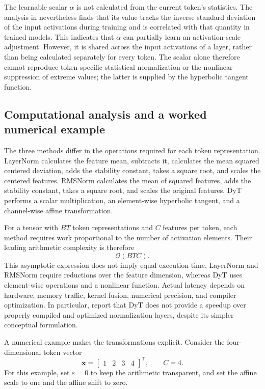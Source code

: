 The learnable scalar \(\alpha\) is not calculated from the current token's
statistics. The analysis in \textcite{zhu2025dyt} nevertheless finds that
its value tracks the inverse standard deviation of the input activations
during training and is correlated with that quantity in trained models.
This indicates that \(\alpha\) can partially learn an activation-scale
adjustment. However, it is shared across the input activations of a layer,
rather than being calculated separately for every token. The scalar alone
therefore cannot reproduce token-specific statistical normalization or
the nonlinear suppression of extreme values; the latter is supplied by
the hyperbolic tangent function.

\subsection{Computational analysis and a worked numerical example}
\label{subsec:norm-computation-example}

The three methods differ in the operations required for each token
representation. LayerNorm calculates the feature mean, subtracts it,
calculates the mean squared centered deviation, adds the stability
constant, takes a square root, and scales the centered features. RMSNorm
calculates the mean of squared features, adds the stability constant,
takes a square root, and scales the original features. DyT performs a
scalar multiplication, an element-wise hyperbolic tangent, and a
channel-wise affine transformation.

For a tensor with \(B T\) token representations and \(C\) features per
token, each method requires work proportional to the number of activation
elements. Their leading arithmetic complexity is therefore
\begin{equation}
    \mathcal{O}(BTC).
    \label{eq:norm-complexity}
\end{equation}
This asymptotic expression does not imply equal execution time. LayerNorm
and RMSNorm require reductions over the feature dimension, whereas DyT
uses element-wise operations and a nonlinear function. Actual latency
depends on hardware, memory traffic, kernel fusion, numerical precision,
and compiler optimization. In particular, \textcite{zhu2025dyt} report
that DyT does not provide a speedup over properly compiled and optimized
normalization layers, despite its simpler conceptual formulation.

A numerical example makes the transformations explicit. Consider the
four-dimensional token vector
\begin{equation}
    \mathbf{x}
    =
    \begin{bmatrix}
        1 & 2 & 3 & 4
    \end{bmatrix}^{\mathsf T},
    \qquad C=4.
    \label{eq:norm-example-input}
\end{equation}
For this example, set \(\varepsilon=0\) to keep the arithmetic transparent,
and set the affine scale to one and the affine shift to zero.

